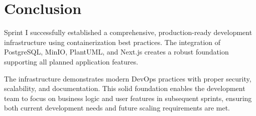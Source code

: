 \section{Conclusion}

Sprint I successfully established a comprehensive, production-ready development infrastructure using containerization best practices. The integration of PostgreSQL, MinIO, PlantUML, and Next.js creates a robust foundation supporting all planned application features.

The infrastructure demonstrates modern DevOps practices with proper security, scalability, and documentation. This solid foundation enables the development team to focus on business logic and user features in subsequent sprints, ensuring both current development needs and future scaling requirements are met.